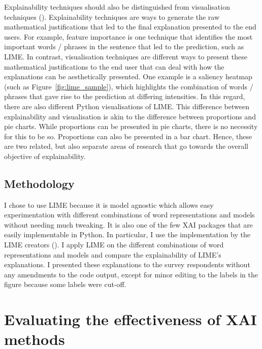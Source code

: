 Explainability techniques should also be distinguished from visualisation techniques (\cite{danilevsky2020}). Explainability techniques are ways to generate the raw mathematical justifications that led to the final explanation presented to the end users. For example, feature importance is one technique that identifies the most important words / phrases in the sentence that led to the prediction, such as LIME. In contrast, visualisation techniques are different ways to present these mathematical justifications to the end user that can deal with how the explanations can be aesthetically presented. One example is a saliency heatmap (such as Figure~\ref{fig:lime_sample}), which highlights the combination of words / phrases that gave rise to the prediction at differing intensities. In this regard, there are also different Python visualisations of LIME. This difference between explainability and visualisation is akin to the difference between proportions and pie charts. While proportions can be presented in pie charts, there is no necessity for this to be so. Proportions can also be presented in a bar chart. Hence, these are two related, but also separate areas of research that go towards the overall objective of explainability.

\subsection{Methodology}
I chose to use LIME because it is model agnostic which allows easy experimentation with different combinations of word representations and models without needing much tweaking. It is also one of the few XAI packages that are easily implementable in Python. In particular, I use the implementation by the LIME creators (\cite{lime_github}). I apply LIME on the different combinations of word representations and models and compare the explainability of LIME's explanations. I presented these explanations to the survey respondents without any amendments to the code output, except for minor editing to the labels in the figure because some labels were cut-off.

\section{Evaluating the effectiveness of XAI methods}

